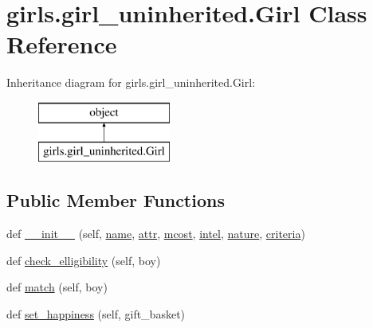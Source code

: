 \hypertarget{classgirls_1_1girl__uninherited_1_1_girl}{}\section{girls.\+girl\+\_\+uninherited.\+Girl Class Reference}
\label{classgirls_1_1girl__uninherited_1_1_girl}
Inheritance diagram for girls.\+girl\+\_\+uninherited.\+Girl\+:\begin{figure}[H]
\begin{center}
\leavevmode
\includegraphics[height=2.000000cm]{classgirls_1_1girl__uninherited_1_1_girl}
\end{center}
\end{figure}
\subsection*{Public Member Functions}
\begin{DoxyCompactItemize}
\item 
def \hyperlink{classgirls_1_1girl__uninherited_1_1_girl_a3baf6cbbda021313abf57a4b2d2e9efa}{\+\_\+\+\_\+init\+\_\+\+\_\+} (self, \hyperlink{classgirls_1_1girl__uninherited_1_1_girl_a17de9450938ef15ad772de7a1acfc197}{name}, \hyperlink{classgirls_1_1girl__uninherited_1_1_girl_a3f915cb51744e34e3d2f88624b402148}{attr}, \hyperlink{classgirls_1_1girl__uninherited_1_1_girl_a6a34ca1b5efd14cc0c70e2a0bd0202dc}{mcost}, \hyperlink{classgirls_1_1girl__uninherited_1_1_girl_a820d0a86b6f84b7d3fc75d142cdedfdc}{intel}, \hyperlink{classgirls_1_1girl__uninherited_1_1_girl_af4b8bfdd9e572a69ce4f5bd047fe4aad}{nature}, \hyperlink{classgirls_1_1girl__uninherited_1_1_girl_a35076aa934b12cc39ae778cf0bb176c9}{criteria})
\item 
def \hyperlink{classgirls_1_1girl__uninherited_1_1_girl_a0fd44810c87eaef7df92c264d5b8f864}{check\+\_\+elligibility} (self, boy)
\item 
def \hyperlink{classgirls_1_1girl__uninherited_1_1_girl_ad587e7008df86ba455a660b464ff5d04}{match} (self, boy)
\item 
def \hyperlink{classgirls_1_1girl__uninherited_1_1_girl_adcb224d694d3995643f9daed685bd6dd}{set\+\_\+happiness} (self, gift\+\_\+basket)
\end{DoxyCompactItemize}
